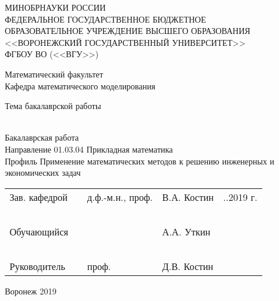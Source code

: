 \begin{titlepage}
    \begin{center}
        МИНОБРНАУКИ РОССИИ\\
        ФЕДЕРАЛЬНОЕ ГОСУДАРСТВЕННОЕ БЮДЖЕТНОЕ\\
        ОБРАЗОВАТЕЛЬНОЕ УЧРЕЖДЕНИЕ ВЫСШЕГО ОБРАЗОВАНИЯ\\
        <<ВОРОНЕЖСКИЙ ГОСУДАРСТВЕННЫЙ УНИВЕРСИТЕТ>>\\
        ФГБОУ ВО (<<ВГУ>>)
        \vskip 3cm

        Математический факультет\\
        Кафедра математического моделирования
        \vskip 3cm

        Тема бакалаврской работы\\
        ~\

        Бакалаврская работа\\
        Направление 01.03.04 Прикладная математика\\
        Профиль Применение математических методов к решению инженерных и экономических задач
        \vskip 3cm

        \begin{tabular}{l l l l l}
            Зав. кафедрой & \underline{\hspace{1.5cm}} & д.ф.-м.н., проф. & В.А. Костин &
            \underline{\hspace{0.5cm}}.\underline{\hspace{0.5cm}}.2019 г.\\
            ~\\
            Обучающийся & \underline{\hspace{1.5cm}} & & А.А. Уткин &\\
            ~\\
            Руководитель & \underline{\hspace{1.5cm}} & проф. & Д.В. Костин &
        \end{tabular}

        \vskip 5cm
        Воронеж 2019
    \end{center}
\end{titlepage}